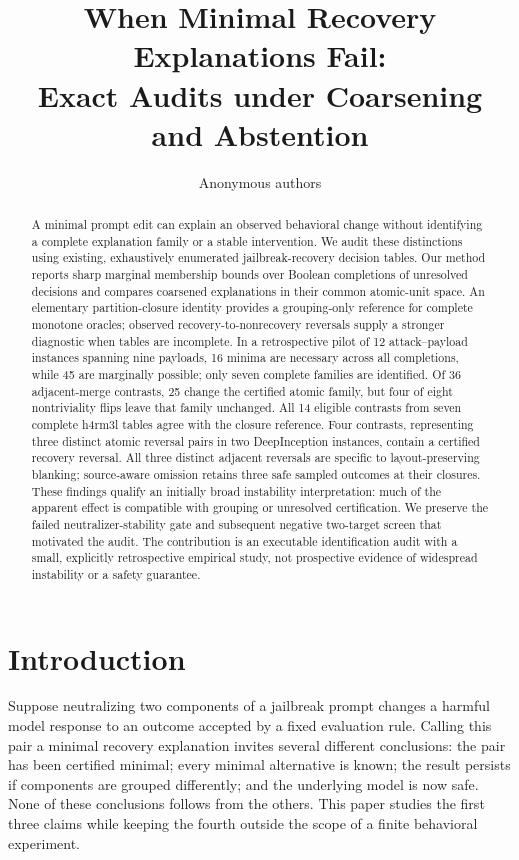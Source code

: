 \documentclass{article}
\title{When Minimal Recovery Explanations Fail:\\
Exact Audits under Coarsening and Abstention}
\author{Anonymous authors}
\begin{document}
\maketitle
{}

\begin{abstract}
A minimal prompt edit can explain an observed behavioral change without
identifying a complete explanation family or a stable intervention. We audit
these distinctions using existing, exhaustively enumerated jailbreak-recovery
decision tables. Our method reports sharp marginal membership bounds over
Boolean completions of unresolved decisions and compares coarsened explanations
in their common atomic-unit space. An elementary partition-closure identity
provides a grouping-only reference for complete monotone oracles; observed
recovery-to-nonrecovery reversals supply a stronger diagnostic when tables are
incomplete. In a retrospective pilot of 12 attack--payload instances spanning
nine payloads, 16 minima are necessary across all completions, while 45 are
marginally possible; only seven complete families are identified. Of 36
adjacent-merge contrasts, 25 change the certified atomic family, but four of
eight nontriviality flips leave that family unchanged. All 14 eligible contrasts
from seven complete h4rm3l tables agree with the closure reference. Four
contrasts, representing three distinct atomic reversal pairs in two
DeepInception instances, contain a certified recovery reversal. All three
distinct adjacent reversals are specific to layout-preserving blanking;
source-aware omission retains three safe sampled outcomes at their closures.
These findings
qualify an initially broad instability interpretation: much of the apparent
effect is compatible with grouping or unresolved certification. We preserve
the failed neutralizer-stability gate and subsequent negative two-target
screen that motivated the audit. The contribution is an executable
identification audit with a small, explicitly retrospective empirical study,
not prospective evidence of widespread instability or a safety guarantee.
\end{abstract}

\section{Introduction}

Suppose neutralizing two components of a jailbreak prompt changes a harmful
model response to an outcome accepted by a fixed evaluation rule. Calling this
pair a minimal recovery explanation invites several different conclusions:
the pair has been certified minimal; every minimal alternative is known; the
result persists if components are grouped differently; and the underlying
model is now safe. None of these conclusions follows from the others.
This paper studies the first three claims while keeping the fourth outside
the scope of a finite behavioral experiment.
\end{document}
